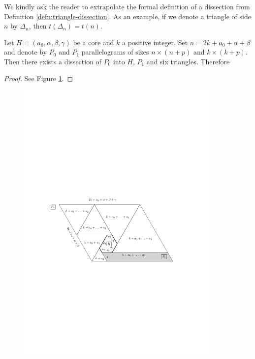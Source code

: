 We kindly ask the reader to extrapolate the formal definition of a dissection from Definition \ref{defn:triangle-dissection}. As an example, if we denote a triangle of side $n$ by $\Delta_n$, then $t(\Delta_n) = t(n)$.

\begin{lem}
\label{lem:core-tiling}
Let $H = (a_0, \alpha, \beta, \gamma)$ be a core and $k$ a positive integer. Set $n = 2k+a_0+\alpha+\beta$ and denote by $P_0$ and $P_1$ parallelograms of sizes $n\times(n+p)$ and $k\times(k+p)$. Then there exists a dissection of $P_0$ into $H$, $P_1$ and six triangles. Therefore
\end{lem}
\begin{proof}
See Figure \ref{fig:core-tiling1}.
\end{proof}

\begin{figure}[htb]
\centering
\includegraphics[width=0.9\textwidth]{img/core_tiling1.pdf}
\caption{}
\label{fig:core-tiling1}
\end{figure}

